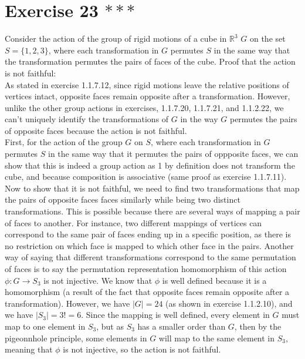 \documentclass{article}
\newcommand{\R}{\mathbb{R}}
\begin{document}
    
    \section*{Exercise 23 $***$}
    Consider the action of the group of rigid motions of a cube in $\R^3$
    $G$ on the set $S = \{1, 2, 3\}$,
    where each transformation in $G$ permutes $S$ in the same way that
    the transformation permutes the pairs of faces of the cube.
    Proof that the action is not faithful: \\
    As stated in exercise 1.1.7.12,
    since rigid motions leave the relative positions of vertices intact,
    opposite faces remain opposite after a transformation.
    However, unlike the other group actions in exercises, 1.1.7.20, 1.1.7.21,
    and 1.1.2.22, we can't uniquely identify the transformations of $G$
    in the way $G$ permutes the pairs of opposite faces
    because the action is not faithful. \\
    First, for the action of the group $G$ on $S$,
    where each transformation in $G$ permutes $S$ in the same way that
    it permutes the pairs of oppposite faces,
    we can show that this is indeed a group action
    as 1 by definition does not transform the cube,
    and because composition is associative
    (same proof as exercise 1.1.7.11). \\
    Now to show that it is not faithful,
    we need to find two transformations that map the pairs of opposite faces
    faces similarly while being two distinct transformations.
    This is possible because there are several ways of mapping a
    pair of faces to another.
    For instance, two different mappings of vertices can correspond to
    the same pair of faces ending up in a specific position,
    as there is no restriction on which face is mapped to which other
    face in the pairs.
    Another way of saying that different transformations correspond to the
    same permutation of faces is to say the permutation representation
    homomorphism of this action $\phi: G \to S_3$ is not injective.
    We know that $\phi$ is well defined because it is a homomorphism
    (a result of the fact that opposite faces remain opposite after a 
    transformation).
    However, we have $|G| = 24$ (as shown in exercise 1.1.2.10),
    and we have $|S_3| = 3! = 6$. 
    Since the mapping is well defined, every element in $G$ must map
    to one element in $S_3$,
    but as $S_3$ has a smaller order than $G$,
    then by the pigeonnhole principle, 
    some elements in $G$ will map to the same element in $S_3$,
    meaning that $\phi$ is not injective,
    so the action is not faithful. \\
\end{document}

